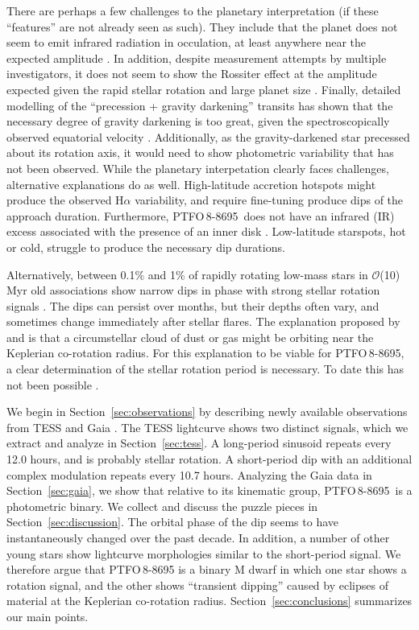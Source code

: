 \documentclass[12pt,twocolumn,tighten]{aastex62}
\newcommand{\ptfo}{PTFO$\,$8-8695}
\begin{document}
There are perhaps a few challenges to the planetary interpretation (if
these ``features'' are not already seen as such).  They include that
the planet does not seem to emit infrared radiation in occulation, at
least anywhere near the expected amplitude \citep{yu_tests_2015}.  In
addition, despite measurement attempts by multiple investigators, it
does not seem to show the Rossiter effect at the amplitude expected
given the rapid stellar rotation and large planet size
\citep{yu_tests_2015,ciardi_followup_2015}.  Finally, detailed
modelling of the ``precession + gravity darkening'' transits has shown
that the necessary degree of gravity darkening is too great, given the
spectroscopically observed equatorial velocity
\citep{howarth_reappraisal_2016}.  Additionally, as the
gravity-darkened star precessed about its rotation axis, it would need
to show photometric variability that has not been observed.  While the
planetary interpetation clearly faces challenges, alternative
explanations do as well.  High-latitude accretion hotspots might
produce the observed H$\alpha$ variability, and require fine-tuning
produce dips of the approach duration. Furthermore, \ptfo\ does not
have an infrared (IR) excess associated with the presence of an inner
disk \citep[{\it e.g.},][Figure~18]{yu_tests_2015}.  Low-latitude
starspots, hot or cold, struggle to produce the necessary dip
durations.

Alternatively, between 0.1\% and 1\% of rapidly rotating low-mass
stars in $\mathcal{O}$(10)$\,$Myr old associations show narrow dips in
phase with strong stellar rotation signals \citep{rebull_usco_2018}.
The dips can persist over months, but their depths often vary, and
sometimes change immediately after stellar flares.  The explanation
proposed by \citet{stauffer_orbiting_2017} and
\citet{david_transient_2017} is that a circumstellar cloud of dust or
gas might be orbiting near the Keplerian co-rotation radius.  For this
explanation to be viable for \ptfo, a clear determination of the
stellar rotation period is necessary.  To date this has not been
possible
\citep{van_eyken_ptf_2012,koen_multicolour_2015,raetz_yeti_2016}.

We begin in Section~\ref{sec:observations} by describing newly
available observations from TESS
\citep{ricker_transiting_2015} and Gaia
\citep{gaia_collaboration_gaia_2018}.  The TESS lightcurve shows two
distinct signals, which we extract and analyze in
Section~\ref{sec:tess}.  A long-period sinusoid repeats every 12.0
hours, and is probably stellar rotation.  A short-period dip with an additional
complex modulation repeats every 10.7 hours.  Analyzing the Gaia
data in Section~\ref{sec:gaia}, we show that relative to its kinematic
group, \ptfo\ is a photometric binary.  We collect and discuss the
puzzle pieces in Section~\ref{sec:discussion}.  The orbital phase of
the dip seems to have instantaneously changed over the past decade.
In addition, a number of other young stars show lightcurve
morphologies similar to the short-period signal.  We therefore argue that PTFO$\,$8-8695 is a binary M
dwarf in which one star shows a rotation signal, and the other 
shows ``transient dipping'' caused by eclipses of
material at the Keplerian co-rotation radius.
Section~\ref{sec:conclusions} summarizes our main points.
\end{document}
